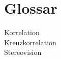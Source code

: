 \documentclass[main.tex]{subfiles}
\begin{document}
	\section{Glossar}

	Korrelation\\
	Kreuzkorrelation\\
	Stereovision
\end{document}
